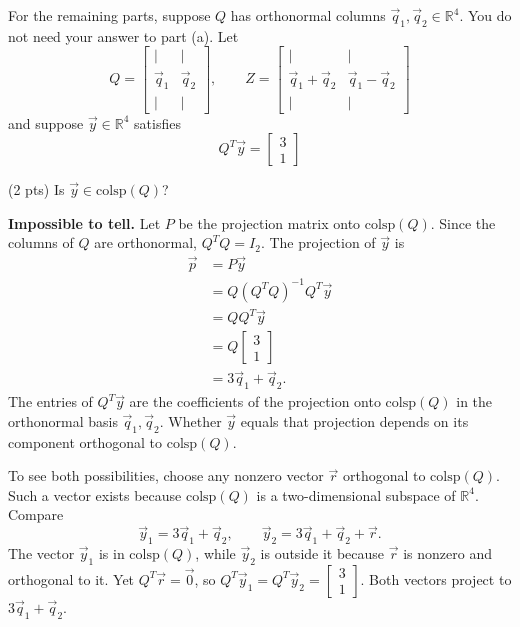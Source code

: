 \documentclass[11pt]{article}
\begin{document}
\begin{prob}[(16 pts)]
For the remaining parts, suppose $Q$ has orthonormal columns $\vec q_1,\vec q_2\in\mathbb R^4$. You do not need your answer to part (a). Let
\[
Q=\begin{bmatrix}|&|\\\vec q_1&\vec q_2\\|&|\end{bmatrix},\qquad
Z=\begin{bmatrix}|&|\\\vec q_1+\vec q_2&\vec q_1-\vec q_2\\|&|\end{bmatrix}
\]
and suppose $\vec y\in\mathbb R^4$ satisfies
\[
Q^T\vec y=\begin{bmatrix}3\\1\end{bmatrix}
\]
\begin{subprob}(2 pts)
Is $\vec y\in\text{colsp}(Q)$?\par\vspace{0.2em}

\begin{solution}
\textbf{Impossible to tell.} Let $P$ be the projection matrix onto $\text{colsp}(Q)$. Since the columns of $Q$ are orthonormal, $Q^TQ=I_2$. The projection of $\vec y$ is
\[
\begin{aligned}
\vec p &= P\vec y \\
&= Q(Q^TQ)^{-1}Q^T\vec y \\
&= QQ^T\vec y \\
&= Q\begin{bmatrix}3\\1\end{bmatrix} \\
&= 3\vec q_1+\vec q_2.
\end{aligned}
\]
The entries of $Q^T\vec y$ are the coefficients of the projection onto $\text{colsp}(Q)$ in the orthonormal basis $\vec q_1,\vec q_2$. Whether $\vec y$ equals that projection depends on its component orthogonal to $\text{colsp}(Q)$.

To see both possibilities, choose any nonzero vector $\vec r$ orthogonal to $\text{colsp}(Q)$. Such a vector exists because $\text{colsp}(Q)$ is a two-dimensional subspace of $\mathbb R^4$. Compare
\[
\vec y_1=3\vec q_1+\vec q_2,\qquad
\vec y_2=3\vec q_1+\vec q_2+\vec r.
\]
The vector $\vec y_1$ is in $\text{colsp}(Q)$, while $\vec y_2$ is outside it because $\vec r$ is nonzero and orthogonal to it. Yet $Q^T\vec r=\vec 0$, so $Q^T\vec y_1=Q^T\vec y_2=\begin{bmatrix}3\\1\end{bmatrix}$. Both vectors project to $3\vec q_1+\vec q_2$.


\end{solution}
\end{subprob}
\end{prob}
\end{document}
